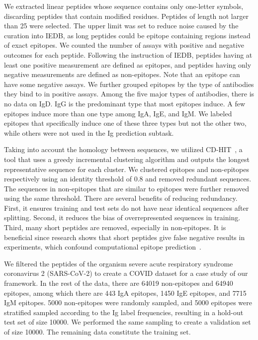 \documentclass[runningheads]{llncs}
\begin{document}
We extracted linear peptides whose sequence contains only one-letter symbols, discarding peptides that contain modified residues. Peptides of length not larger than 25 were selected. The upper limit was set to reduce noise caused by the curation into IEDB, as long peptides could be epitope containing regions instead of exact epitopes. We counted the number of assays with positive and negative outcomes for each peptide. Following the instruction of IEDB, peptides having at least one positive measurement are defined as epitopes, and peptides having only negative measurements are defined as non-epitopes. Note that an epitope can have some negative assays. We further grouped epitopes by the type of antibodies they bind to in positive assays. Among the five major types of antibodies, there is no data on IgD. IgG is the predominant type that most epitopes induce. A few epitopes induce more than one type among IgA, IgE, and IgM. We labeled epitopes that specifically induce one of these three types but not the other two, while others were not used in the Ig prediction subtask.

Taking into account the homology between sequences, we utilized CD-HIT~\cite{fu2012cd}, a tool that uses a greedy incremental clustering algorithm and outputs the longest representative sequence for each cluster. We clustered epitopes and non-epitopes respectively using an identity threshold of 0.8 and removed redundant sequences. The sequences in non-epitopes that are similar to epitopes were further removed using the same threshold. There are several benefits of reducing redundancy. First, it ensures training and test sets do not have near identical sequences after splitting. Second, it reduces the bias of overrepresented sequences in training. Third, many short peptides are removed, especially in non-epitopes. It is beneficial since research shows that short peptides give false negative results in experiments, which confound computational epitope prediction~\cite{rahman2016inadequate}.

We filtered the peptides of the organism severe acute respiratory syndrome coronavirus 2 (SARS-CoV-2) to create a COVID dataset for a case study of our framework. In the rest of the data, there are 64019 non-epitopes and 64940 epitopes, among which there are 443 IgA epitopes, 1450 IgE epitopes, and 7715 IgM epitopes. 5000 non-epitopes were randomly sampled, and 5000 epitopes were stratified sampled according to the Ig label frequencies, resulting in a hold-out test set of size 10000. We performed the same sampling to create a validation set of size 10000. The remaining data constitute the training set.
\end{document}
